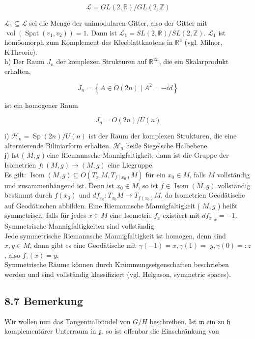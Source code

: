 \documentclass[10pt, letterpaper]{article}
\begin{document}
$$
\mathcal{L}=G L(2, \mathbb{R}) / G L(2, \mathbb{Z})
$$

$\mathcal{L}_{1} \subseteq \mathcal{L}$ sei die Menge der unimodularen Gitter, also der Gitter mit $\operatorname{vol}\left(\operatorname{Spat}\left(v_{1}, v_{2}\right)\right)=1$. Dann ist $\mathcal{L}_{1}=S L(2, \mathbb{R}) / S L(2, \mathbb{Z})$. $\mathcal{L}_{1}$ ist homöomorph zum Komplement des Kleeblattknotens in $\mathbb{R}^{3}$ (vgl. Milnor, KTheorie).\\
h) Der Raum $J_{n}$ der komplexen Strukturen auf $\mathbb{R}^{2 n}$, die ein Skalarprodukt erhalten,

$$
J_{n}=\left\{A \in O(2 n) \mid A^{2}=-i d\right\}
$$

ist ein homogener Raum

$$
J_{n}=O(2 n) / U(n)
$$

i) $\mathcal{H}_{n}=\operatorname{Sp}(2 n) / U(n)$ ist der Raum der komplexen Strukturen, die eine alternierende Biliniarform erhalten. $\mathcal{H}_{n}$ heiße Siegelsche Halbebene.\\
j) Ist ( $M, g$ ) eine Riemannsche Mannigfaltigkeit, dann ist die Gruppe der Isometrien $f:(M, g) \rightarrow(M, g)$ eine Liegruppe.\\
Es gilt: $\operatorname{Isom}(M, g) \subseteq O\left(T_{x_{0}} M, T_{f\left(x_{0}\right)} M\right)$ für ein $x_{0} \in M$, falls $M$ vollständig und zusammenhängend ist. Denn ist $x_{0} \in M$, so ist $f \in \operatorname{Isom}(M, g)$ vollständig bestimmt durch $f\left(x_{0}\right)$ und $d f_{x_{0}}: T_{x_{0}} M \rightarrow T_{f\left(x_{0}\right)} M$, da Isometrien Geodätische auf Geodätischen abbilden. Eine Riemannsche Mannigfaltigkeit ( $M, g$ ) heißt symmetrisch, falls für jedes $x \in M$ eine Isometrie $f_{x}$ existiert mit $\left.d f_{x}\right|_{x}=-1$. Symmetrische Mannigfaltigkeiten sind vollständig.\\
Jede symmetrische Riemannsche Mannigfaltigkeit ist homogen, denn sind $x, y \in M$, dann gibt es eine Geodätische mit $\gamma(-1)=x, \gamma(1)=$ $y, \gamma(0)=: z$, also $f_{z}(x)=y$.\\
Symmetrische Räume können durch Krümmungseigenschaften beschrieben werden und sind vollständig klassifiziert (vgl. Helgason, symmetric spaces).

\subsection*{8.7 Bemerkung}
Wir wollen nun das Tangentialbündel von $G / H$ beschreiben. Ist $\mathfrak{m}$ ein zu $\mathfrak{h}$ komplementärer Unterraum in $\mathfrak{g}$, so ist offenbar die Einschränkung von
\end{document}

